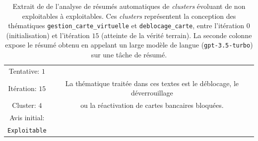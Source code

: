 \begin{table}[!htb]
\begin{center}
\begin{tabular}{|c|c|}
				{ \footnotesize Tentative: $1$ }
					& 
					\tabularnewline
				{ \footnotesize Itération: $15$ }
					& { \footnotesize La thématique traitée dans ces textes est le déblocage, le déverrouillage }
					\tabularnewline
				{ \footnotesize Cluster: $4$ }
					& { \footnotesize ou la réactivation de cartes bancaires bloquées. }
					\tabularnewline
				{ \footnotesize Avis initial: }
					&
					\tabularnewline
				{ \footnotesize \color{colorDarkPastelGreen} \texttt{Exploitable} }
					&
					\tabularnewline
					\hline
					
				\end{tabular}
				\end{center}
				\caption{Extrait de de l'analyse de résumés automatiques de \textit{clusters} évoluant de non exploitables à exploitables.
				Ces \textit{clusters} représentent la conception des thématiques \texttt{gestion\_carte\_virtuelle} et \texttt{deblocage\_carte}, entre l'itération $0$ (initialisation) et l'itération $15$ (atteinte de la vérité terrain).
				La seconde colonne expose le résumé obtenu en appelant un large modèle de langue (\texttt{gpt-3.5-turbo}) sur une tâche de résumé.
				}
				\label{table:4.4.3-ETUDE-PERTINENCE-RESUME-AUTOMATIQUE-DEBLOCAGE-CARTE-GESTION-CARTE-VIRTUELLE}
			\end{table}
			
